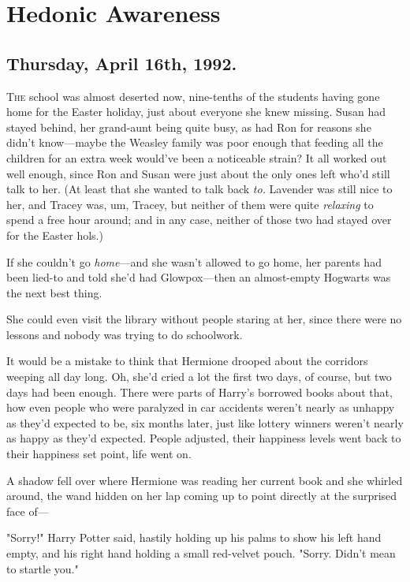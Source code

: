 \chapter{Hedonic Awareness}

\section{Thursday, April 16th, 1992.}

\lettrine{T}{he} school was almost deserted now, nine-tenths of the students having gone
home for the Easter holiday, just about everyone she knew missing. Susan had
stayed behind, her grand-aunt being quite busy, as had Ron for reasons she
didn’t know—maybe the Weasley family was poor enough that feeding all the
children for an extra week would’ve been a noticeable strain? It all worked out
well enough, since Ron and Susan were just about the only ones left who’d still
talk to her. (At least that she wanted to talk back \emph{to.} Lavender was
still nice to her, and Tracey was, um, Tracey, but neither of them were quite
\emph{relaxing} to spend a free hour around; and in any case, neither of those
two had stayed over for the Easter hols.)

If she couldn’t go \emph{home}—and she wasn’t allowed to go home, her parents
had been lied-to and told she’d had Glowpox—then an almost-empty Hogwarts was
the next best thing.

She could even visit the library without people staring at her, since there
were no lessons and nobody was trying to do schoolwork.

It would be a mistake to think that Hermione drooped about the corridors
weeping all day long. Oh, she’d cried a lot the first two days, of course, but
two days had been enough. There were parts of Harry’s borrowed books about
that, how even people who were paralyzed in car accidents weren’t nearly as
unhappy as they’d expected to be, six months later, just like lottery winners
weren’t nearly as happy as they’d expected. People adjusted, their happiness
levels went back to their happiness set point, life went on.

A shadow fell over where Hermione was reading her current book and she whirled
around, the wand hidden on her lap coming up to point directly at the surprised
face of—

"Sorry!" Harry Potter said, hastily holding up his palms to show his left hand
empty, and his right hand holding a small red-velvet pouch. "Sorry. Didn’t mean
to startle you."

